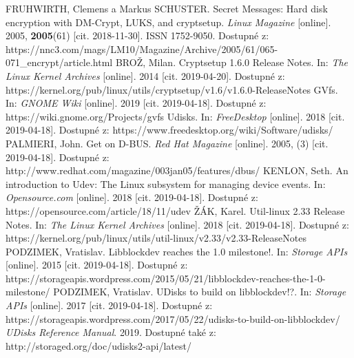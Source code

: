 \documentclass[a4paper,12pt]{article}
\begin{document}
{
FRUHWIRTH, Clemens a Markus SCHUSTER. Secret Messages: Hard disk encryption with DM-Crypt, LUKS, and cryptsetup. \textit{Linux Magazine} [online]. 2005, \textbf{2005}(61) [cit. 2018-11-30]. ISSN 1752-9050. Dostupné z: https://nnc3.com/mags/LM10/Magazine/Archive/2005/61/065-071\_encrypt/article.html
BROŽ, Milan. Cryptsetup 1.6.0 Release Notes. In: \textit{The Linux Kernel Archives} [online]. 2014 [cit. 2019-04-20]. Dostupné z: https://kernel.org/pub/linux/utils/cryptsetup/v1.6/v1.6.0-ReleaseNotes
GVfs. In: \textit{GNOME Wiki} [online]. 2019 [cit. 2019-04-18]. Dostupné z: https://wiki.gnome.org/Projects/gvfs
Udisks. In: \textit{FreeDesktop} [online]. 2018 [cit. 2019-04-18]. Dostupné z: https://www.freedesktop.org/wiki/Software/udisks/
PALMIERI, John. Get on D-BUS. \textit{Red Hat Magazine} [online]. 2005, (3) [cit. 2019-04-18]. Dostupné z: http://www.redhat.com/magazine/003jan05/features/dbus/
KENLON, Seth. An introduction to Udev: The Linux subsystem for managing device events. In: \textit{Opensource.com} [online]. 2018 [cit. 2019-04-18]. Dostupné z: https://opensource.com/article/18/11/udev
ŽÁK, Karel. Util-linux 2.33 Release Notes. In: \textit{The Linux Kernel Archives} [online]. 2018 [cit. 2019-04-18]. Dostupné z: https://kernel.org/pub/linux/utils/util-linux/v2.33/v2.33-ReleaseNotes
PODZIMEK, Vratislav. Libblockdev reaches the 1.0 milestone!. In: \textit{Storage APIs} [online]. 2015 [cit. 2019-04-18]. Dostupné z: https://storageapis.wordpress.com/2015/05/21/libblockdev-reaches-the-1-0-milestone/
PODZIMEK, Vratislav. UDisks to build on libblockdev!?. In: \textit{Storage APIs} [online]. 2017 [cit. 2019-04-18]. Dostupné z: https://storageapis.wordpress.com/2017/05/22/udisks-to-build-on-libblockdev/
\textit{UDisks Reference Manual}. 2019. Dostupné také z: http://storaged.org/doc/udisks2-api/latest/
}





\seznamobr  %


\seznamtab  %




\end{document}
